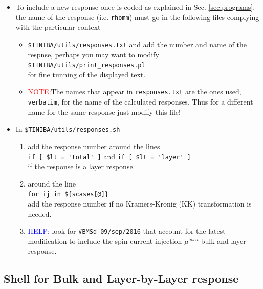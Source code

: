 \documentclass[12pt]{article}
\numberwithin{equation}{section}
\begin{document}
\begin{itemize}
\begin{itemize}
\item To include a new response once is coded as explained in
 Sec. \ref{sec:programs}, 
the name of the response (i.e. \verb=rhomm=) 
 must go in the following files complying with the particular context 
\begin{itemize}
\item 
\verb=$TINIBA/utils/responses.txt=  
and add the
 number and name of the respnse, perhaps you may want to modify\\
\verb=$TINIBA/utils/print_responses.pl=\\ for fine tunning
of the displayed text. 
\item\textcolor{red}{NOTE:}The names that appear in
  \verb=responses.txt= are the ones used, \verb=verbatim=, for the name
  of the calculated responses. Thus for a different name for the same
  response just modify this file!
\end{itemize}
\item In \verb=$TINIBA/utils/responses.sh=
\begin{enumerate}
\item add the response number around the lines\\
\Verb+if [ $lt = 'total' ]+ and \Verb+if [ $lt = 'layer' ]+
\\
if the response is a layer response. 
\item around the line \\
\Verb+for ij in ${scases[@]}+
\\
add the response number if no Kramers-Kronig (KK) transformation is
needed. 

\item \textcolor{blue}{HELP:} look for 
\verb=#BMSd 09/sep/2016= that account for the latest modification to
include the spin current injection $\mu^{abcd}$ bulk and layer response.

\end{enumerate}
\end{itemize}

\end{itemize}


\subsection{Shell for Bulk and Layer-by-Layer response}
\end{document}
